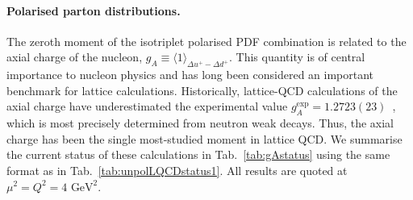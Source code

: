 \paragraph{Polarised parton distributions.}
The zeroth moment of the isotriplet polarised PDF combination is related to the 
axial charge of the nucleon, $g_A\equiv \langle 1\rangle_{\Delta u^+-\Delta d^+}$.
%
This quantity is of central importance to nucleon physics and has long been 
considered an important benchmark for lattice calculations. 
%
Historically, lattice-QCD calculations of the axial charge have underestimated 
the experimental value $g_A^{\mathrm{exp}} = 1.2723(23)$~\cite{Olive:2016xmw}, 
which is most precisely determined from neutron weak decays. 
%
Thus, the axial charge has been the single most-studied moment in lattice QCD.
%
We summarise the current status of these calculations in 
Tab.~\ref{tab:gAstatus} using the same format as in 
Tab.~\ref{tab:unpolLQCDstatus1}.
%
All results are quoted at $\mu^2=Q^2=4\mbox{ GeV}^2$.

